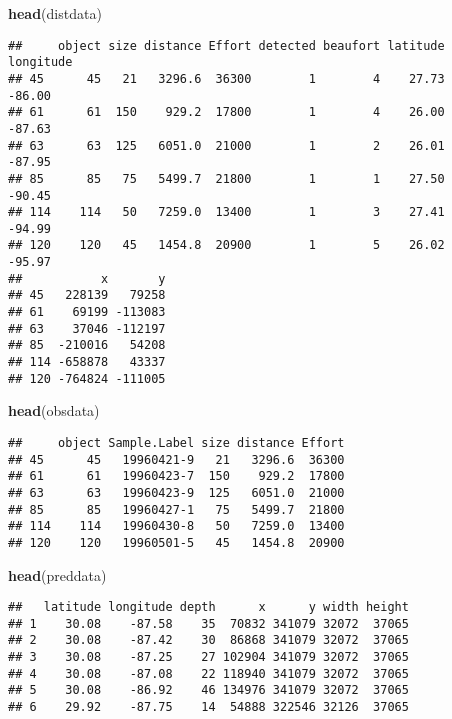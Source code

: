 \documentclass[]{article}
\newenvironment{Shaded}{}{}
\newcommand{\KeywordTok}[1]{\textcolor[rgb]{0.00,0.44,0.13}{\textbf{{#1}}}}
\newcommand{\NormalTok}[1]{{#1}}
\begin{document}
\begin{Shaded}
\begin{Highlighting}[]
\KeywordTok{head}\NormalTok{(distdata)}
\end{Highlighting}
\end{Shaded}

\begin{verbatim}
##     object size distance Effort detected beaufort latitude longitude
## 45      45   21   3296.6  36300        1        4    27.73    -86.00
## 61      61  150    929.2  17800        1        4    26.00    -87.63
## 63      63  125   6051.0  21000        1        2    26.01    -87.95
## 85      85   75   5499.7  21800        1        1    27.50    -90.45
## 114    114   50   7259.0  13400        1        3    27.41    -94.99
## 120    120   45   1454.8  20900        1        5    26.02    -95.97
##           x       y
## 45   228139   79258
## 61    69199 -113083
## 63    37046 -112197
## 85  -210016   54208
## 114 -658878   43337
## 120 -764824 -111005
\end{verbatim}

\begin{Shaded}
\begin{Highlighting}[]
\KeywordTok{head}\NormalTok{(obsdata)}
\end{Highlighting}
\end{Shaded}

\begin{verbatim}
##     object Sample.Label size distance Effort
## 45      45   19960421-9   21   3296.6  36300
## 61      61   19960423-7  150    929.2  17800
## 63      63   19960423-9  125   6051.0  21000
## 85      85   19960427-1   75   5499.7  21800
## 114    114   19960430-8   50   7259.0  13400
## 120    120   19960501-5   45   1454.8  20900
\end{verbatim}

\begin{Shaded}
\begin{Highlighting}[]
\KeywordTok{head}\NormalTok{(preddata)}
\end{Highlighting}
\end{Shaded}

\begin{verbatim}
##   latitude longitude depth      x      y width height
## 1    30.08    -87.58    35  70832 341079 32072  37065
## 2    30.08    -87.42    30  86868 341079 32072  37065
## 3    30.08    -87.25    27 102904 341079 32072  37065
## 4    30.08    -87.08    22 118940 341079 32072  37065
## 5    30.08    -86.92    46 134976 341079 32072  37065
## 6    29.92    -87.75    14  54888 322546 32126  37065
\end{verbatim}
\end{document}
